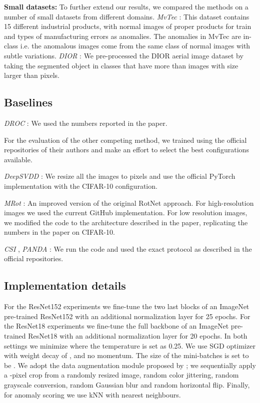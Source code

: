 \documentclass[letterpaper]{article} \usepackage{aaai23}  \usepackage{times}  \usepackage{helvet}  \usepackage{courier}  \usepackage[hyphens]{url}  \usepackage{graphicx} \usepackage{amsmath, amssymb}
\begin{document}
\textbf{Small datasets:} To further extend our results, we compared the methods on a number of small datasets from different domains. \textit{MvTec} \cite{bergmann2019mvtec}: This dataset contains 15 different industrial products, with normal images of proper products for train and  types of manufacturing errors as anomalies. The anomalies in MvTec are in-class i.e. the anomalous images come from the same class of normal images with subtle variations. \textit{DIOR} \cite{li2020object}: We pre-processed the DIOR aerial image dataset by taking the segmented object in classes that have more than  images with size larger than  pixels. 

\subsection{Baselines}
\label{appendix:baselines}
\textit{DROC} \cite{sohn2020learning}: We used the numbers reported in the paper.

For the evaluation of the other competing method, we trained using the official repositories of their authors and make an effort to select the best configurations available.

\textit{DeepSVDD} \cite{ruff2018deep}: We resize all the images to  pixels and use the official PyTorch implementation with the CIFAR-10 configuration.

\textit{MRot} \cite{hendrycks2019using}: An improved version of the original RotNet approach. For high-resolution images we used the current GitHub implementation. For low resolution images, we modified the code to the architecture described in the paper, replicating the numbers in the paper on CIFAR-10.

\textit{CSI} \cite{tack2020csi}, \textit{PANDA} \cite{reiss2021panda}: We run the code and used the exact protocol as described in the official repositories.

\subsection{Implementation details}
\label{appendix:imp_details}
For the ResNet152 experiments we fine-tune the two last blocks of an ImageNet pre-trained ResNet152 with an additional  normalization layer for 25 epochs. For the ResNet18 experiments we fine-tune the full backbone of an ImageNet pre-trained ResNet18 with an additional  normalization layer for 20 epochs. In both settings we minimize  where the temperature  is set as 0.25.  We use SGD optimizer with weight decay of , and no momentum. The size of the mini-batches is set to be . We adopt the data augmentation module proposed by \cite{chen2020improved}; we sequentially apply a -pixel crop from a randomly resized image, random color jittering, random grayscale conversion, random Gaussian blur and random horizontal flip. Finally, for anomaly scoring we use kNN with  nearest neighbours. 
\end{document}
